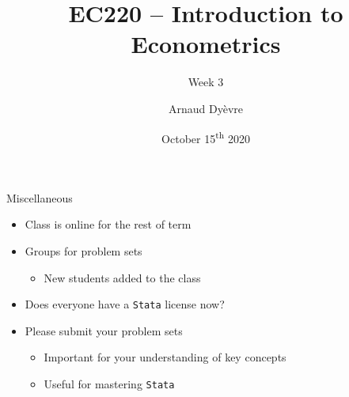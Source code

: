 \documentclass[aspectratio=169, 11pt]{beamer}
\title[]{EC220 -- Introduction to Econometrics} %
\subtitle{Week 3}
\author{Arnaud Dy\`evre} %
\institute[] %
{
}
\date{October 15\textsuperscript{th} 2020} %
\begin{document}
\begin{frame}
\titlepage %
\end{frame}




\begin{frame}{Miscellaneous}

     
\begin{itemize}[<+- | alert@+>]
    \item Class is online for the rest of  term 
    \item Groups for problem sets
    \begin{itemize}
        \item New students added to the class
    \end{itemize}
    \item Does everyone have a \texttt{Stata} license now?
    \item Please submit your problem sets
    \begin{itemize}
        \item Important for your understanding of key concepts
        \item Useful for mastering \texttt{Stata}
    \end{itemize}
\end{itemize}


\end{frame}
\end{document}
